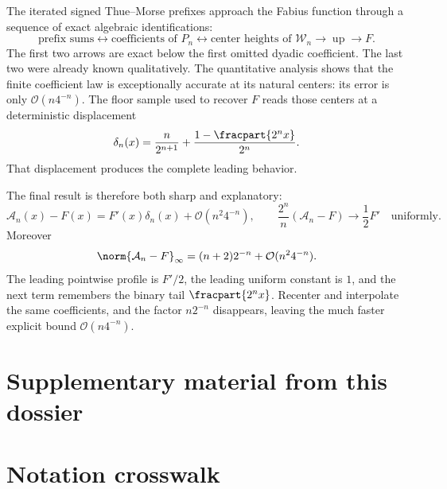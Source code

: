 \documentclass[11pt,oneside]{article}
\theoremstyle{definition}
\theoremstyle{remark}
\newcommand{\Up}{\operatorname{up}}
\newcommand{\bigO}{\mathcal O}
\begin{document}
The iterated signed Thue--Morse prefixes approach the Fabius function through a
sequence of exact algebraic identifications:
\begin{equation*}
 \text{prefix sums}
 \longleftrightarrow
 \text{coefficients of }P_n
 \longleftrightarrow
 \text{center heights of }\mathcal W_n
 \longrightarrow \Up
 \longrightarrow F.
\end{equation*}
The first two arrows are exact below the first omitted dyadic coefficient.  The
last two were already known qualitatively.  The quantitative analysis shows that
the finite coefficient law is exceptionally accurate at its natural centers:
its error is only $\bigO(n4^{-n})$.  The floor sample used to recover $F$ reads
those centers at a deterministic displacement
\begin{equation*}
 \delta_n(x)=\frac{n}{2^{n+1}}+
 \frac{1-\fracpart{2^n x}}{2^n}.
\end{equation*}
That displacement produces the complete leading behavior.

The final result is therefore both sharp and explanatory:
\begin{equation*}
 \mathcal A_n(x)-F(x)
 =F'(x)\delta_n(x)+\bigO(n^2 4^{-n}),
 \qquad
 \frac{2^n}{n}(\mathcal A_n-F)\longrightarrow\frac12F'
 \quad\text{uniformly}.
\end{equation*}
Moreover
\begin{equation*}
 \norm{\mathcal A_n-F}_\infty
 =(n+2)2^{-n}+\bigO(n^2 4^{-n}).
\end{equation*}
The leading pointwise profile is $F'/2$, the leading uniform constant is $1$,
and the next term remembers the binary tail $\fracpart{2^n x}$.  Recenter
and interpolate the same coefficients, and the factor $n2^{-n}$ disappears,
leaving the much faster explicit bound $\bigO(n4^{-n})$.

\clearpage
\section*{Supplementary material from this dossier}
\section{Notation crosswalk}
\label{tmrate:app:notation}
\end{document}
